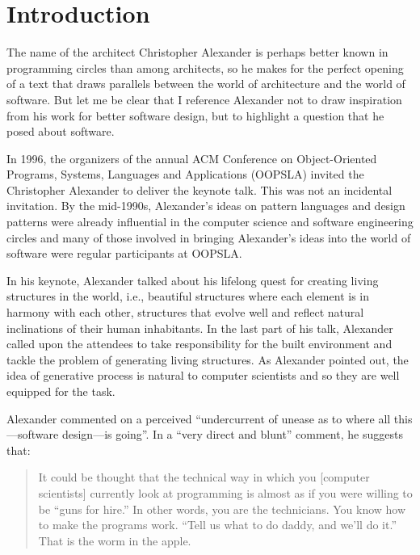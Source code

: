 \chapter{Introduction}

The name of the architect Christopher Alexander is perhaps better known in programming
circles than among architects, so he makes for the perfect opening
of a text that draws parallels between the world of architecture and the world of software.
But let me be clear that I reference Alexander not to draw inspiration from his work
for better software design, but to highlight a question that he posed about software.

In 1996, the organizers of the annual ACM Conference on Object-Oriented Programs, Systems,
Languages and Applications (OOPSLA) invited the Christopher Alexander to deliver
the keynote talk. This was not an incidental invitation. By the mid-1990s, Alexander's ideas
on pattern languages and design patterns were already influential in the computer science and
software engineering circles and many of those involved in bringing Alexander's ideas into the
world of software were regular participants at OOPSLA.

In his keynote, Alexander talked about his lifelong quest for creating living structures
in the world, i.e., beautiful structures where each element is in harmony with each other,
structures that evolve well and reflect natural inclinations of their human inhabitants.
In the last part of his talk, Alexander called upon the attendees to take responsibility
for the built environment and tackle the problem of generating living structures.
As Alexander pointed out, the idea of generative process is natural to computer scientists
and so they are well equipped for the task.

Alexander commented on a perceived ``undercurrent of unease as to where all
this---software design---is going''. In a ``very direct and blunt'' comment, he suggests that:

\begin{quote}
It could be thought that the technical way in which you [computer scientists] currently look at
programming is almost as if you were willing to be ``guns for hire.'' In other words, you are the
technicians. You know how to make the programs work. ``Tell us what to do daddy, and we'll do it.''
That is the worm in the apple.
\end{quote}

